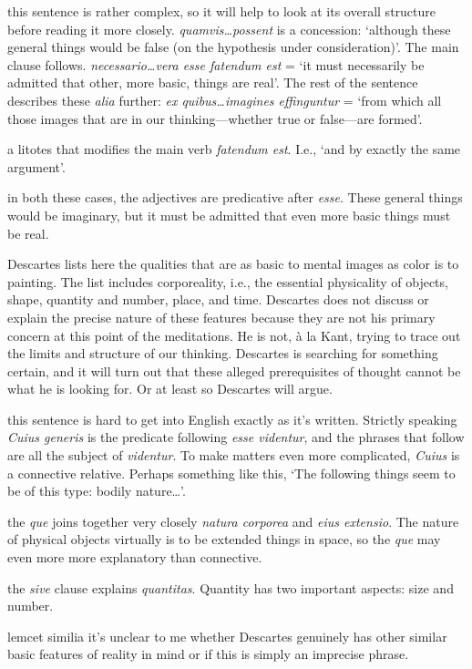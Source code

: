 \prenotes

 this sentence is rather complex, so it will help to look at its overall structure before reading it more closely. \textit{quamvis\dots possent} is a concession: `although these general things would be false (on the hypothesis under consideration)'. The main clause follows. \textit{necessario\dots vera esse fatendum est} = `it must necessarily be admitted that other, more basic, things are real'. The rest of the sentence describes these \textit{alia} further: \textit{ex quibus\dots imagines effinguntur} = `from which all those images that are in our thinking---whether true or false---are formed'.

 a litotes that modifies the main verb \textit{fatendum est}. I.e., `and by exactly the same argument'.

 in both these cases, the adjectives are predicative after \textit{esse}. These general things would be imaginary, but it must be admitted that even more basic things must be real.

Descartes lists here the qualities that are as basic to mental images as color is to painting. The list includes corporeality, i.e., the essential physicality of objects, shape, quantity and number, place, and time. Descartes does not discuss or explain the precise nature of these features because they are not his primary concern at this point of the meditations. He is not, à la Kant, trying to trace out the limits and structure of our thinking. Descartes is searching for something certain, and it will turn out that these alleged prerequisites of thought cannot be what he is looking for. Or at least so Descartes will argue.

 this sentence is hard to get into English exactly as it's written. Strictly speaking \textit{Cuius generis} is the predicate following \textit{esse videntur}, and the phrases that follow are all the subject of \textit{videntur}. To make matters even more complicated, \textit{Cuius} is a connective relative. Perhaps something like this, `The following things seem to be of this type: bodily nature\dots'.

 the \textit{que} joins together very closely \textit{natura corporea} and \textit{eius extensio}. The nature of physical objects virtually is to be extended things in space, so the \textit{que} may even more more explanatory than connective.

 the \textit{sive} clause explains \textit{quantitas}. Quantity has two important aspects: size and number.

lemc{et similia} it's unclear to me whether Descartes genuinely has other similar basic features of reality in mind or if this is simply an imprecise phrase.


